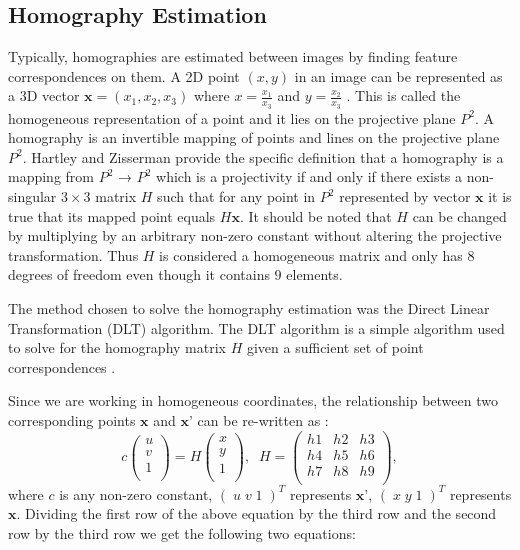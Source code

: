 
\subsection{Homography Estimation} %
\label{sub:tracking_library_for_the_web:marker_less_tracking_algorithm:homography_estimation}

Typically, homographies are estimated between images by finding feature correspondences on them. A 2D point $(x,y)$ in an image can be represented as a 3D vector $\textbf{x} = (x_1, x_2, x_3)$ where $x = \frac{x_1}{x_3}$ and $y = \frac{x_2}{x_3}$ \cite{Homography2009}. This is called the homogeneous representation of a point and it lies on the projective plane $P^2$. A homography is an invertible mapping of points and lines on the projective plane $P^2$. Hartley and Zisserman \cite{Hartley2004} provide the specific definition that a homography is a mapping from $P^2$ → $P^2$ which is a projectivity if and only if there exists a non-singular $3\times3$ matrix $H$ such that for any point in $P^2$ represented by vector $\textbf{x}$ it is true that its mapped point equals $H\textbf{x}$. It should be noted that $H$ can be changed by multiplying by an arbitrary non-zero constant without altering the projective transformation. Thus $H$ is considered a homogeneous matrix and only has $8$ degrees of freedom even though it contains $9$ elements.

The method chosen to solve the homography estimation was the Direct Linear Transformation (DLT) \cite{Impa2009,Hartley2004} algorithm. The DLT algorithm is a simple algorithm used to solve for the homography matrix $H$ given a sufficient set of point correspondences \cite{Homography2009}.

Since we are working in homogeneous coordinates, the relationship between two corresponding points $\textbf{x}$ and $\textbf{x'}$ can be re-written as \cite{Homography2009}:
$$c\begin{pmatrix}u\\ v\\ 1\\\end{pmatrix} = H\begin{pmatrix}x\\ y\\ 1\\\end{pmatrix}, \;\; H=\begin{pmatrix}h1 & h2 & h3\\ h4 & h5 & h6\\ h7 & h8 & h9\\\end{pmatrix},$$
where $c$ is any non-zero constant, $(\; u \; v \; 1 \;)^T$ represents $\textbf{x'}$, $(\; x \; y \; 1 \;)^T$ represents $\textbf{x}$. Dividing the first row of the above equation by the third row and the second row by the third row we get the following two equations:

